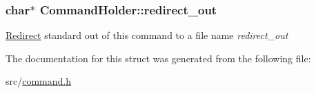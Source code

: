 \subsubsection[{\texorpdfstring{redirect\+\_\+out}{redirect\_out}}]{\setlength{\rightskip}{0pt plus 5cm}char$\ast$ Command\+Holder\+::redirect\+\_\+out}\hypertarget{structCommandHolder_ac7bfc3e78a8e8b511e2b324c45a17d6f}{}\label{structCommandHolder_ac7bfc3e78a8e8b511e2b324c45a17d6f}
\hyperlink{structRedirect}{Redirect} standard out of this command to a file name {\itshape redirect\+\_\+out} 

The documentation for this struct was generated from the following file\+:\begin{DoxyCompactItemize}
\item 
src/\hyperlink{command_8h}{command.\+h}\end{DoxyCompactItemize}
